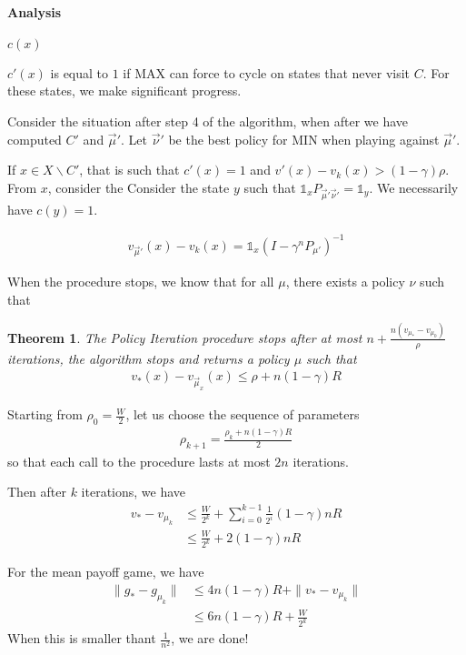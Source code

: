 \documentclass{article}
\newtheorem{theorem}{Theorem}
\def\1{{\mathds 1}}
\begin{document}
\paragraph{Analysis}
  
  $c(x)$ 

  $c'(x)$ is equal to $1$ if MAX can force to cycle on states that never visit $C$. For these states, we make significant progress.

  
  Consider the situation after step 4 of the algorithm, when after we have computed $C'$ and $\vec\mu'$. Let $\vec\nu'$ be the best policy for MIN when playing against $\vec\mu'$. 
  
  If $x \in X \backslash C'$, that is such that $c'(x)=1$ and $v'(x)-v_k(x) > (1-\gamma)\rho$.
  From $x$, consider the 
  Consider the state $y$ such that $\1_x P_{\vec\mu'\vec\nu'} = \1_y$. We necessarily have $c(y)=1$.

  
  
  \begin{align}
    v_{\vec\mu'}(x) - v_k(x) = \1_x (I-\gamma^n P_{\mu'})^{-1}
  \end{align}

  
  When the procedure stops, we know that for all $\mu$, there exists a policy $\nu$ such that 


  
  \begin{theorem}
    The Policy Iteration procedure stops after at most $n+\frac{n (v_{\mu_*}-v_{\mu_0})}{\rho}$ iterations, the algorithm stops and returns a policy $\mu$ such that
    \begin{align}
      v_*(x) - v_{\vec\mu_x}(x) \le \rho + n(1-\gamma) R 
    \end{align}
  \end{theorem}

  
  Starting from $\rho_0=\frac{W}{2}$, let us choose the sequence of parameters
  \begin{align}
    \rho_{k+1} = \frac{\rho_k+n(1-\gamma) R}{2}
  \end{align}
  so that each call to the procedure lasts at most $2n$ iterations.

  Then after $k$ iterations, we have
  \begin{align}
    v_* - v_{\mu_k} &\le \frac{W}{2^k} + \sum_{i=0}^{k-1} \frac{1}{2^i}(1-\gamma)n R \\
    &\le \frac{W}{2^k} + 2(1-\gamma)n R
  \end{align}
  
  For the mean payoff game, we have
  \begin{align}
    \| g_* - g_{\mu_k} \| & \le 4n(1-\gamma)R + \|v_*-v_{\mu_k}\| \\
    & \le 6n(1-\gamma)R + \frac{W}{2^k}
  \end{align}
  When this is smaller thant $\frac{1}{n^2}$, we are done!
    
 





\end{document}
